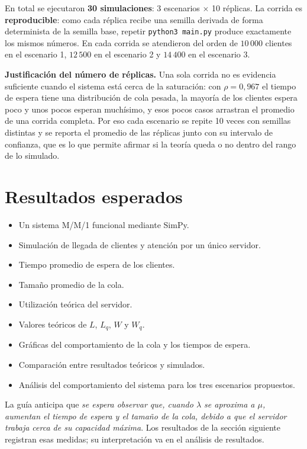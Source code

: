 \documentclass[11pt,a4paper]{article}
\begin{document}
En total se ejecutaron \textbf{30 simulaciones}: 3 escenarios $\times$ 10 réplicas. La
corrida es \textbf{reproducible}: como cada réplica recibe una semilla derivada de forma
determinista de la semilla base, repetir \texttt{python3 main.py} produce exactamente
los mismos números. En cada corrida se atendieron del orden de $10\,000$ clientes en el
escenario 1, $12\,500$ en el escenario 2 y $14\,400$ en el escenario 3.

\noindent\textbf{Justificación del número de réplicas.} Una sola corrida no es evidencia
suficiente cuando el sistema está cerca de la saturación: con $\rho = 0{,}967$ el tiempo
de espera tiene una distribución de cola pesada, la mayoría de los clientes espera poco
y unos pocos esperan muchísimo, y esos pocos casos arrastran el promedio de una corrida
completa. Por eso cada escenario se repite 10 veces con semillas distintas y se reporta
el promedio de las réplicas junto con su intervalo de confianza, que es lo que permite
afirmar si la teoría queda o no dentro del rango de lo simulado.

\section{Resultados esperados}
\begin{itemize}
    \item Un sistema M/M/1 funcional mediante SimPy.
    \item Simulación de llegada de clientes y atención por un único servidor.
    \item Tiempo promedio de espera de los clientes.
    \item Tamaño promedio de la cola.
    \item Utilización teórica del servidor.
    \item Valores teóricos de $L$, $L_q$, $W$ y $W_q$.
    \item Gráficas del comportamiento de la cola y los tiempos de espera.
    \item Comparación entre resultados teóricos y simulados.
    \item Análisis del comportamiento del sistema para los tres escenarios propuestos.
\end{itemize}

\noindent La guía anticipa que \emph{se espera observar que, cuando $\lambda$ se
aproxima a $\mu$, aumentan el tiempo de espera y el tamaño de la cola, debido a que el
servidor trabaja cerca de su capacidad máxima}. Los resultados de la sección siguiente
registran esas medidas; su interpretación va en el análisis de resultados.
\end{document}
